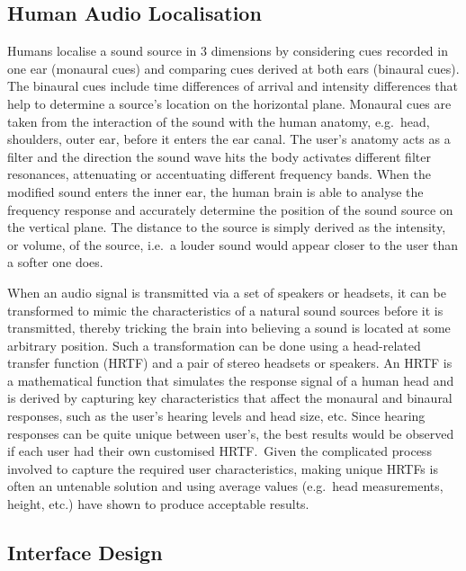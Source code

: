 \documentclass{llncs}
\begin{document}
\subsection{Human Audio Localisation}

Humans localise a sound source in 3 dimensions by considering cues recorded in one ear (monaural cues) and comparing cues derived at both ears (binaural cues)\cite{blauert1997spatial,blauert1969sound}.
The binaural cues include time differences of arrival and intensity differences that help to determine a source's location on the horizontal plane.
Monaural cues are taken from the interaction of the sound with the human anatomy, e.g.\ head, shoulders, outer ear, before it enters the ear canal.
The user's anatomy acts as a filter and the direction the sound wave hits the body activates different filter resonances, attenuating or accentuating different frequency bands.
When the modified sound enters the inner ear, the human brain is able to analyse the frequency response and accurately determine the position of the sound source on the vertical plane. 
The distance to the source is simply derived as the intensity, or volume, of the source, i.e.\ a louder sound would appear closer to the user than a softer one does. 

When an audio signal is transmitted via a set of speakers or headsets, it can be transformed to mimic the characteristics of a natural sound sources before it is transmitted, thereby tricking the brain into believing a sound is located at some arbitrary position.
Such a transformation can be done using a head-related transfer function (HRTF) and a pair of stereo headsets or speakers.
An HRTF is a mathematical function that simulates the response signal of a human head and is derived by capturing key characteristics that affect the monaural and binaural responses, such as the user's hearing levels and head size, etc.
Since hearing responses can be quite unique between user's, the best results would be observed if each user had their own customised HRTF.\
Given the complicated process involved to capture the required user characteristics, making unique HRTFs is often an untenable solution and using average values (e.g.\ head measurements, height, etc.) have shown to produce acceptable results.

\subsection{Interface Design}
\end{document}
